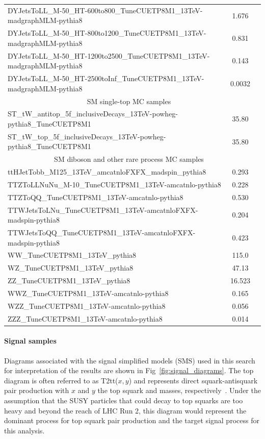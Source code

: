 \begin{table}[hp]
{\begin{tabular}{lcc}
DYJetsToLL\_M-50\_HT-600to800\_TuneCUETP8M1\_13TeV-madgraphMLM-pythia8 & 1.676 \\
DYJetsToLL\_M-50\_HT-800to1200\_TuneCUETP8M1\_13TeV-madgraphMLM-pythia8 & 0.831 \\
DYJetsToLL\_M-50\_HT-1200to2500\_TuneCUETP8M1\_13TeV-madgraphMLM-pythia8 & 0.143 \\
DYJetsToLL\_M-50\_HT-2500toInf\_TuneCUETP8M1\_13TeV-madgraphMLM-pythia8 & 0.0032 \\
\hline
\multicolumn{2}{c}{SM single-top MC samples} \\ \hline
ST\_tW\_antitop\_5f\_inclusiveDecays\_13TeV-powheg-pythia8\_TuneCUETP8M1 & 35.80\\
ST\_tW\_top\_5f\_inclusiveDecays\_13TeV-powheg-pythia8\_TuneCUETP8M1 & 35.80\\
\hline
\multicolumn{2}{c}{SM diboson and other rare process MC samples} \\ \hline
ttHJetTobb\_M125\_13TeV\_amcatnloFXFX\_madspin\_pythia8 & 0.293 \\
TTZToLLNuNu\_M-10\_TuneCUETP8M1\_13TeV-amcatnlo-pythia8 & 0.228 \\
TTZToQQ\_TuneCUETP8M1\_13TeV-amcatnlo-pythia8 & 0.530 \\
TTWJetsToLNu\_TuneCUETP8M1\_13TeV-amcatnloFXFX-madspin-pythia8 & 0.204 \\
TTWJetsToQQ\_TuneCUETP8M1\_13TeV-amcatnloFXFX-madspin-pythia8 & 0.423 \\
WW\_TuneCUETP8M1\_13TeV\_pythia8 & 115.0 \\
WZ\_TuneCUETP8M1\_13TeV\_pythia8 & 47.13 \\
ZZ\_TuneCUETP8M1\_13TeV\_pythia8 & 16.523 \\
WWZ\_TuneCUETP8M1\_13TeV-amcatnlo-pythia8 & 0.165 \\
WZZ\_TuneCUETP8M1\_13TeV-amcatnlo-pythia8 & 0.056 \\
ZZZ\_TuneCUETP8M1\_13TeV-amcatnlo-pythia8 & 0.014 \\
\hline \hline
\end{tabular}
}
\end{table}

\paragraph{Signal samples}

Diagrams associated with the signal simplified models (SMS) used in this search for interpretation of the results are shown in Fig~\ref{fig:signal_diagrams}. The top diagram is often referred to as T2tt($x,y$) and represents direct squark-antisquark pair production with $x$ and $y$ the top squark and \chiOneZero masses, respectively~\cite{CMS-SMS-paper}. Under the assumption that the SUSY particles that could decay to top squarks are too heavy and beyond the reach of LHC Run 2, this diagram would represent the dominant process for top squark pair production and the target signal process for this analysis.

